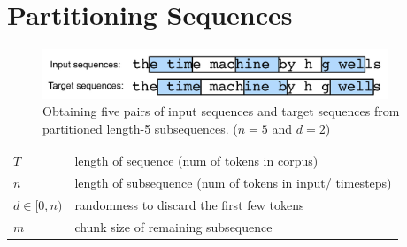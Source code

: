 \section{Partitioning Sequences \cite{dnn-1}} \label{Partitioning Sequences}

\begin{figure}[H]
    \centering
    \includegraphics[width=\linewidth, height=1.5cm, keepaspectratio]{Pictures/Recurrent-Neural-Networks/Partitioning-Sequences.jpg}
    \caption*{Obtaining five pairs of input sequences and target sequences from partitioned length-5 subsequences. ($n=5$ and $d=2$)}
\end{figure}


\begin{customTableWrapper}{1.5}
\begin{table}[H]
    \centering
    \begin{tabular}{l p{8cm}}
        $T$ & length of sequence (num of tokens in corpus) \\
        $n$ & length of subsequence (num of tokens in input/ timesteps) \\
        $d\in [0,n)$ & randomness to discard the first few tokens \\
        $m$ & chunk size of remaining subsequence \\
    \end{tabular}
\end{table}
\end{customTableWrapper}


